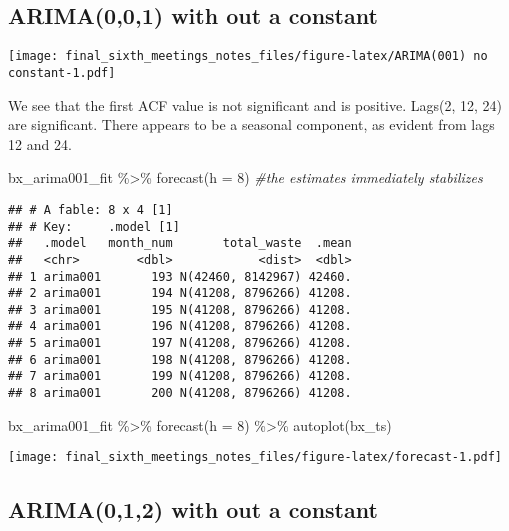 \documentclass[
]{article}
\newenvironment{Shaded}{\begin{snugshade}}{\end{snugshade}}
\newcommand{\AttributeTok}[1]{\textcolor[rgb]{0.77,0.63,0.00}{#1}}
\newcommand{\CommentTok}[1]{\textcolor[rgb]{0.56,0.35,0.01}{\textit{#1}}}
\newcommand{\DecValTok}[1]{\textcolor[rgb]{0.00,0.00,0.81}{#1}}
\newcommand{\FunctionTok}[1]{\textcolor[rgb]{0.00,0.00,0.00}{#1}}
\newcommand{\NormalTok}[1]{#1}
\newcommand{\SpecialCharTok}[1]{\textcolor[rgb]{0.00,0.00,0.00}{#1}}
\begin{document}
\hypertarget{arima001-with-out-a-constant}{%
\subsection{ARIMA(0,0,1) with out a
constant}\label{arima001-with-out-a-constant}}

\texttt{[image: final\_sixth\_meetings\_notes\_files/figure-latex/ARIMA(001) no constant-1.pdf]}

We see that the first ACF value is not significant and is positive.
Lags(2, 12, 24) are significant. There appears to be a seasonal
component, as evident from lags 12 and 24.

\begin{Shaded}
\begin{Highlighting}[]
\NormalTok{bx\_arima001\_fit }\SpecialCharTok{\%\textgreater{}\%} \FunctionTok{forecast}\NormalTok{(}\AttributeTok{h =} \DecValTok{8}\NormalTok{) }\CommentTok{\#the estimates immediately stabilizes}
\end{Highlighting}
\end{Shaded}

\begin{verbatim}
## # A fable: 8 x 4 [1]
## # Key:     .model [1]
##   .model   month_num       total_waste  .mean
##   <chr>        <dbl>            <dist>  <dbl>
## 1 arima001       193 N(42460, 8142967) 42460.
## 2 arima001       194 N(41208, 8796266) 41208.
## 3 arima001       195 N(41208, 8796266) 41208.
## 4 arima001       196 N(41208, 8796266) 41208.
## 5 arima001       197 N(41208, 8796266) 41208.
## 6 arima001       198 N(41208, 8796266) 41208.
## 7 arima001       199 N(41208, 8796266) 41208.
## 8 arima001       200 N(41208, 8796266) 41208.
\end{verbatim}

\begin{Shaded}
\begin{Highlighting}[]
\NormalTok{bx\_arima001\_fit }\SpecialCharTok{\%\textgreater{}\%} \FunctionTok{forecast}\NormalTok{(}\AttributeTok{h =} \DecValTok{8}\NormalTok{) }\SpecialCharTok{\%\textgreater{}\%} \FunctionTok{autoplot}\NormalTok{(bx\_ts)}
\end{Highlighting}
\end{Shaded}

\texttt{[image: final\_sixth\_meetings\_notes\_files/figure-latex/forecast-1.pdf]}

\hypertarget{arima012-with-out-a-constant}{%
\subsection{ARIMA(0,1,2) with out a
constant}\label{arima012-with-out-a-constant}}
\end{document}
